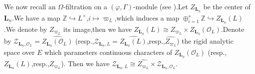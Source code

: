 \documentclass[SecEq,CM,GP]{degruyter-crelle} %
\theoremstyle{plain}
\newcommand{\ana}{{\rm an}}
\newcommand{\rig}{{\rm rig}}
\newcommand{\rigerch}{{\mathcal{Z}_{\bL_{\ul{n}},\mathcal{O}_L}}}
\newcommand{\rigerchl}{{\mathcal{Z}_{\bL_{\ul{n}},L}}}
\newcommand{\Spec}{\rm Spec}
\newcommand{\sban}{{\left(\Spec\mathfrak{Z}_{\Omega}\right)^{\mathrm{rig}}}}
\newcommand{\te}{{\otimes_E}}
\newcommand{\unr}{{\rm unr}}
\newcommand{\ul}{\underline}
\newcommand{\wdre}{{\textbf{WD}}}
\newcommand{\BG}{{\mathbb{G}}}
\newcommand{\BZ}{{\mathbb{Z}}}
\newcommand{\bL}{{\mathbf{L}}}
\newcommand{\bZ}{{\mathbf{Z}}}
\newcommand{\cO}{\mathcal O}
\newcommand{\FZ}{{\mathfrak{Z}}}
\newcommand{\fl}{{\mathfrak{l}}}
\newcommand{\fz}{{\mathfrak{z}}}
\begin{document}
We now recall an $\Omega$-filtration on a $(\varphi,\Gamma)$-module (see \cite[Section 4.1.2]{Ding2021}).\;Let $Z_{\bL_{\ul{n}}}$ be the center of $\bL_{\ul{n}}$.\;We have a map $\BZ\hookrightarrow L^\times$,\;$i\mapsto \varpi_L$,\;which induces a map $\oplus_{i=1}^s\BZ\hookrightarrow Z_{\bL_{\ul{n}}}(L)$.\;We denote by $Z_{\varpi_L}$ its image,\;then we have $Z_{\bL_{\ul{n}}}(L)\cong Z_{\varpi_L}\times Z_{\bL_{\ul{n}}}(\cO_L)$.\;Denote by $\rigerch=\widehat{Z_{\bL_{\ul{n}}}(\cO_L)}$ (resp.,\;$\rigerchl=\widehat{Z_{\bL_{\ul{n}}}(L)}$,\;resp.,\;$\widehat{Z_{\varpi_L}}$) the rigid analytic space over $E$ which  parameters continuous characters of $Z_{\bL_{\ul{n}}}(\cO_L)$ (resp.,\;$Z_{\bL_{\ul{n}}}(L)$,\;resp.,\;$Z_{\varpi_L}$). Then we have $\rigerchl\cong \widehat{Z_{\varpi_L}}\times \rigerch$.\;




\end{document}
